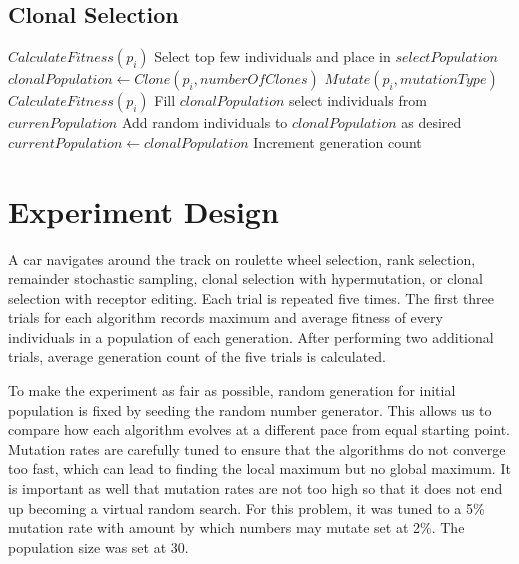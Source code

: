 \documentclass[]{interact}
\theoremstyle{plain} %
\theoremstyle{definition}
\theoremstyle{remark}
\begin{document}
\subsection{Clonal Selection \cite{BroND}}

\begin{algorithmic}[1]
            \State $CalculateFitness(p_{i})$
        \EndFor
        \State Select top few individuals and place in $selectPopulation$
            \State $clonalPopulation \leftarrow Clone(p_i, numberOfClones)$
        \EndFor
            \State $Mutate(p_i, mutationType)$
            \State $CalculateFitness(p_i)$
        \EndFor
        \State Fill $clonalPopulation$ select individuals from $currenPopulation$
        \State Add random individuals to $clonalPopulation$ as desired
        \State $currentPopulation \leftarrow clonalPopulation$
        \State Increment generation count
    \EndWhile
	\EndFunction
\end{algorithmic}

\section{Experiment Design}
A car navigates around the track on roulette wheel selection, rank selection, remainder stochastic sampling, clonal selection with hypermutation, or clonal selection with receptor editing. Each trial is repeated five times. The first three trials for each algorithm records maximum and average fitness of every individuals in a population of each generation. After performing two additional trials, average generation count of the five trials is calculated.

To make the experiment as fair as possible, random generation for initial population is fixed by seeding the random number generator. This allows us to compare how each algorithm evolves at a different pace from equal starting point. Mutation rates are carefully tuned to ensure that the algorithms do not converge too fast, which can lead to finding the local maximum but no global maximum. It is important as well that mutation rates are not too high so that it does not end up becoming a virtual random search. For this problem, it was tuned to a 5\% mutation rate with amount by which numbers may mutate set at 2\%. The population size was set at 30.
\end{document}
